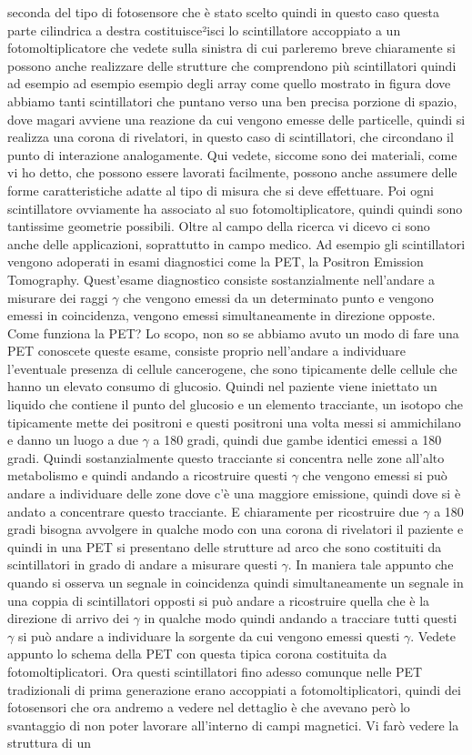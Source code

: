 seconda del tipo di fotosensore che è stato scelto quindi in questo caso questa parte cilindrica a destra costituisce²isci lo scintillatore accoppiato a un fotomoltiplicatore che vedete sulla sinistra di cui parleremo breve chiaramente si possono anche realizzare delle strutture che comprendono più scintillatori quindi ad esempio ad esempio esempio degli array come quello mostrato in figura dove abbiamo tanti scintillatori che puntano verso una ben precisa porzione di spazio, dove magari avviene una reazione da cui vengono emesse delle particelle, quindi si realizza una corona di rivelatori, in questo caso di scintillatori, che circondano il punto di interazione analogamente. Qui vedete, siccome sono dei materiali, come vi ho detto, che possono essere lavorati facilmente, possono anche assumere delle forme caratteristiche adatte al tipo di misura che si deve effettuare. Poi ogni scintillatore ovviamente ha associato al suo fotomoltiplicatore, quindi quindi sono tantissime geometrie possibili. Oltre al campo della ricerca vi dicevo ci sono anche delle applicazioni, soprattutto in campo medico. Ad esempio gli scintillatori vengono adoperati in esami diagnostici come la PET, la Positron Emission Tomography. Quest'esame diagnostico consiste sostanzialmente nell'andare a misurare dei raggi $\gamma$ che vengono emessi da un determinato punto e vengono emessi in coincidenza, vengono emessi simultaneamente in direzione opposte. Come funziona la PET? Lo scopo, non so se abbiamo avuto un modo di fare una PET conoscete queste esame, consiste proprio nell'andare a individuare l'eventuale presenza di cellule cancerogene, che sono tipicamente delle cellule che hanno un elevato consumo di glucosio. Quindi nel paziente viene iniettato un liquido che contiene il punto del glucosio e un elemento tracciante, un isotopo che tipicamente mette dei positroni e questi positroni una volta messi si ammichilano e danno un luogo a due $\gamma$ a 180 gradi, quindi due gambe identici emessi a 180 gradi. Quindi sostanzialmente questo tracciante si concentra nelle zone all'alto metabolismo e quindi andando a ricostruire questi $\gamma$ che vengono emessi si può andare a individuare delle zone dove c'è una maggiore emissione, quindi dove si è andato a concentrare questo tracciante. E chiaramente per ricostruire due $\gamma$ a 180 gradi bisogna avvolgere in qualche modo con una corona di rivelatori il paziente e quindi in una PET si presentano delle strutture ad arco che sono costituiti da scintillatori in grado di andare a misurare questi $\gamma$. In maniera tale appunto che quando si osserva un segnale in coincidenza quindi simultaneamente un segnale in una coppia di scintillatori opposti si può andare a ricostruire quella che è la direzione di arrivo dei $\gamma$ in qualche modo quindi andando a tracciare tutti questi $\gamma$ si può andare a individuare la sorgente da cui vengono emessi questi $\gamma$. Vedete appunto lo schema della PET con questa tipica corona costituita da fotomoltiplicatori. Ora questi scintillatori fino adesso comunque nelle PET tradizionali di prima generazione erano accoppiati a fotomoltiplicatori, quindi dei fotosensori che ora andremo a vedere nel dettaglio è che avevano però lo svantaggio di non poter lavorare all'interno di campi magnetici. Vi farò vedere la struttura di un 